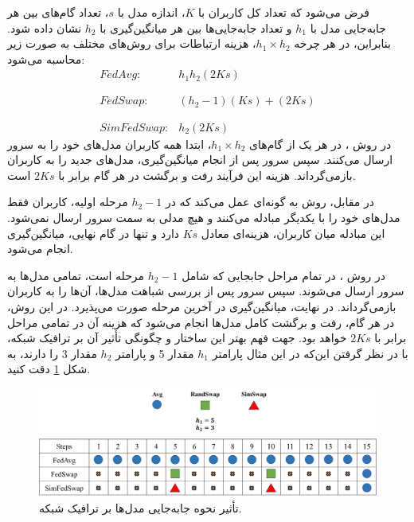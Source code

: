 فرض می‌شود که تعداد کل کاربران با \(K\)، اندازه مدل با \(s\)، تعداد گام‌های بین هر جابه‌جایی مدل با \(h_1\) و تعداد جابه‌جایی‌ها بین هر میانگین‌گیری با \(h_2\) نشان داده شود. بنابراین، در هر چرخه \( h_1 \times h_2 \)، هزینه ارتباطات برای روش‌های مختلف به صورت زیر محاسبه می‌شود:
\begin{equation}
	\begin{array}{ll}
		FedAvg: & h_1h_2 (2Ks)
		\\ \\ \\
		FedSwap: & (h_2-1)(Ks) + (2Ks)
		\\ \\ \\
		SimFedSwap: & h_2(2Ks)
	\end{array}
\end{equation}
در روش ، در هر یک از گام‌های \( h_1 \times h_2 \)، ابتدا همه کاربران مدل‌های خود را به سرور ارسال می‌کنند. سپس سرور پس از انجام میانگین‌گیری، مدل‌های جدید را به کاربران بازمی‌گرداند. هزینه این فرآیند رفت و برگشت در هر گام برابر با \( 2Ks \) است.

در مقابل، روش  به گونه‌ای عمل می‌کند که در \( h_2 - 1 \) مرحله اولیه، کاربران فقط مدل‌های خود را با یکدیگر مبادله می‌کنند و هیچ مدلی به سمت سرور ارسال نمی‌شود. این مبادله میان کاربران، هزینه‌ای معادل \( Ks \) دارد و تنها در گام نهایی، میانگین‌گیری انجام می‌شود.

در روش ، در تمام مراحل جابجایی که شامل \( h_2 - 1 \) مرحله است، تمامی مدل‌ها به سرور ارسال می‌شوند. سپس سرور پس از بررسی شباهت مدل‌ها، آن‌ها را به کاربران بازمی‌گرداند. در نهایت، میانگین‌گیری در آخرین مرحله صورت می‌پذیرد. در این روش، در هر گام، رفت و برگشت کامل مدل‌ها انجام می‌شود که هزینه آن در تمامی مراحل برابر با \( 2Ks \) خواهد بود. جهت فهم بهتر این ساختار و چگونگی تأثیر آن بر ترافیک شبکه، با در نظر گرفتن این‌که در این مثال پارامتر \(h_1\) مقدار 5 و پارامتر \(h_2\) مقدار 3 را دارند، به شکل
\ref{compare_swap_net_traffic} 
دقت کنید.

\begin{figure}[b!]
	\centering
	\includegraphics[scale=0.3]{images/chap4/compare_swap_net_traffic.png}%
	\caption{%
		تأثیر نحوه جابه‌جایی مدل‌ها بر ترافیک شبکه.
	}
	\label{compare_swap_net_traffic}
	\centering
\end{figure}


